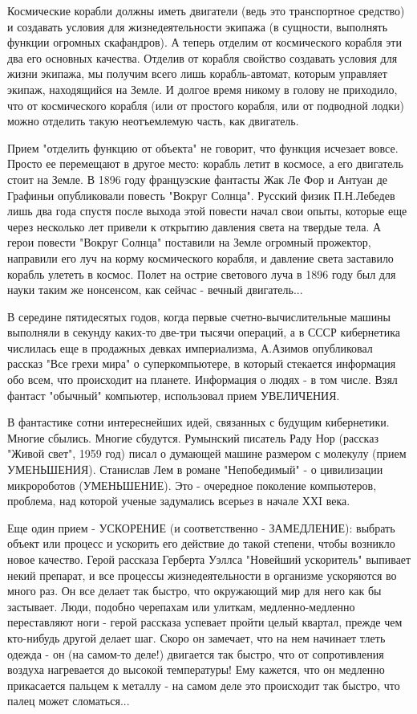 \documentclass[11pt,a4paper]{article}
\begin{document}
Космические корабли должны иметь двигатели (ведь это транспортное средство) и создавать условия для жизнедеятельности экипажа (в сущности, выполнять функции огромных скафандров). А теперь отделим от космического корабля эти два его основных качества. Отделив от корабля свойство создавать условия для жизни экипажа, мы получим всего лишь корабль-автомат, которым управляет экипаж, находящийся на Земле. И долгое время никому в голову не приходило, что от космического корабля (или от простого корабля, или от подводной лодки) можно отделить такую неотъемлемую часть, как двигатель.

Прием "отделить функцию от объекта" не говорит, что функция исчезает вовсе. Просто ее перемещают в другое место: корабль летит в космосе, а его двигатель стоит на Земле. В 1896 году французские фантасты Жак Ле Фор и Антуан де Графиньи опубликовали повесть "Вокруг Солнца". Русский физик П.Н.Лебедев лишь два года спустя после выхода этой повести начал свои опыты, которые еще через несколько лет привели к открытию давления света на твердые тела. А герои повести "Вокруг Солнца" поставили на Земле огромный прожектор, направили его луч на корму космического корабля, и давление света заставило корабль улететь в космос. Полет на острие светового луча в 1896 году был для науки таким же нонсенсом, как сейчас - вечный двигатель...

В середине пятидесятых годов, когда первые счетно-вычислительные машины выполняли в секунду каких-то две-три тысячи операций, а в СССР кибернетика числилась еще в продажных девках империализма, А.Азимов опубликовал рассказ "Все грехи мира" о суперкомпьютере, в который стекается информация обо всем, что происходит на планете. Информация о людях - в том числе. Взял фантаст "обычный" компьютер, использовал прием УВЕЛИЧЕНИЯ.

В фантастике сотни интереснейших идей, связанных с будущим кибернетики. Многие сбылись. Многие сбудутся. Румынский писатель Раду Нор (рассказ "Живой свет", 1959 год) писал о думающей машине размером с молекулу (прием УМЕНЬШЕНИЯ). Станислав Лем в романе "Непобедимый" - о цивилизации микророботов (УМЕНЬШЕНИЕ). Это - очередное поколение компьютеров, проблема, над которой ученые задумались всерьез в начале ХХI века.

Еще один прием - УСКОРЕНИЕ (и соответственно - ЗАМЕДЛЕНИЕ): выбрать объект или процесс и ускорить его действие до такой степени, чтобы возникло новое качество. Герой рассказа Герберта Уэллса "Новейший ускоритель" выпивает некий препарат, и все процессы жизнедеятельности в организме ускоряются во много раз. Он все делает так быстро, что окружающий мир для него как бы застывает. Люди, подобно черепахам или улиткам, медленно-медленно переставляют ноги - герой рассказа успевает пройти целый квартал, прежде чем кто-нибудь другой делает шаг. Скоро он замечает, что на нем начинает тлеть одежда - он (на самом-то деле!) двигается так быстро, что от сопротивления воздуха нагревается до высокой температуры! Ему кажется, что он медленно прикасается пальцем к металлу - на самом деле это происходит так быстро, что палец может сломаться...
\end{document}
